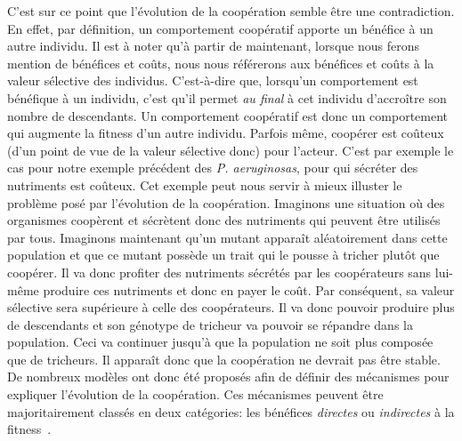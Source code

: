 		C'est sur ce point que l'évolution de la coopération semble être une contradiction. En effet, par définition, un comportement coopératif apporte un bénéfice à un autre individu. Il est à noter qu'à partir de maintenant, lorsque nous ferons mention de bénéfices et coûts, nous nous référerons aux bénéfices et coûts à la valeur sélective des individus. C'est-à-dire que, lorsqu'un comportement est bénéfique à un individu, c'est qu'il permet \emph{au final} à cet individu d'accroître son nombre de descendants. Un comportement coopératif est donc un comportement qui augmente la fitness d'un autre individu. Parfois même, coopérer est coûteux (d'un point de vue de la valeur sélective donc) pour l'acteur. C'est par exemple le cas pour notre exemple précédent des \emph{P. aeruginosas}, pour qui sécréter des nutriments est coûteux. Cet exemple peut nous servir à mieux illuster le problème posé par l'évolution de la coopération. Imaginons une situation où des organismes coopèrent et sécrètent donc des nutriments qui peuvent être utilisés par tous. Imaginons maintenant qu'un mutant apparaît aléatoirement dans cette population et que ce mutant possède un trait qui le pousse à tricher plutôt que coopérer. Il va donc profiter des nutriments sécrétés par les coopérateurs sans lui-même produire ces nutriments et donc en payer le coût. Par conséquent, sa valeur sélective sera supérieure à celle des coopérateurs. Il va donc pouvoir produire plus de descendants et son génotype de tricheur va pouvoir se répandre dans la population. Ceci va continuer jusqu'à que la population ne soit plus composée que de tricheurs. Il apparaît donc que la coopération ne devrait pas être stable. De nombreux modèles ont donc été proposés afin de définir des mécanismes pour expliquer l'évolution de la coopération. Ces mécanismes peuvent être majoritairement classés en deux catégories: les bénéfices \emph{directes} ou \emph{indirectes} à la fitness~\parencite{West2007a}.

